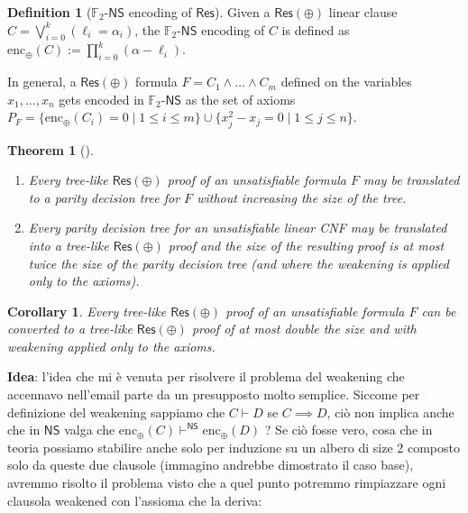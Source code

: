 \documentclass[12pt]{article}
\newtheorem{theorem}{Theorem}
\newtheorem{corollary}{Corollary}
\theoremstyle{definition}
\newtheorem{definition}{Definition}
\newcommand{\F}{\mathbb{F}}
\newcommand{\Res}{\mathsf{Res}}
\newcommand{\ResP}{\mathsf{Res(\oplus)}}
\newcommand{\NS}{\mathsf{NS}}
\newcommand{\FNS}{\F_2\text{-}\mathsf{NS}}
\newcommand{\enc}{\mathrm{enc}}
\begin{document}
    \begin{definition}[$\FNS$ encoding of $\Res$]
        Given a $\ResP$ linear clause $C = \bigvee\limits_{i = 0}^k (\ell_i = \alpha_i)$, the $\FNS$ encoding of $C$ is defined as $\enc_{\oplus}(C) := \prod\limits_{i = 0}^k (\alpha - \ell_i)$.
        
        In general, a $\ResP$ formula $F = C_1 \land \ldots \land C_m$ defined on the variables $x_1, \ldots, x_n$ gets encoded in $\FNS$ as the set of axioms $P_F = \{\enc_{\oplus}(C_i) = 0 \mid 1 \leq i \leq m\} \cup \{x_j^2-x_j = 0 \mid 1 \leq j \leq n\}$.
    \end{definition}

    \begin{theorem}[\cite{res_parity}]
        \;
        \begin{enumerate}
            \item Every tree-like $\ResP$ proof of an unsatisfiable formula $F$ may be translated to a parity decision tree for $F$ without increasing the size of the tree.
            
            \item Every parity decision tree for an unsatisfiable linear CNF may be translated into a tree-like $\ResP$ proof and the size of the resulting proof is at most twice the size of the parity decision tree (and where the weakening is applied only to the axioms).
        \end{enumerate}
    \end{theorem}

    \begin{corollary}
        Every tree-like $\ResP$ proof of an unsatisfiable formula $F$ can be converted to a tree-like $\ResP$ proof of at most double the size and with weakening applied only to the axioms.
    \end{corollary}


    \textbf{Idea}: l'idea che mi è venuta per risolvere il problema del weakening che accennavo nell'email parte da un presupposto molto semplice. Siccome per definizione del weakening sappiamo che $C \vdash D$ se $C \implies D$, ciò non implica anche che in $\NS$ valga che $\enc_{\oplus}(C) \vdash^\NS \enc_{\oplus}(D)$ ? Se ciò fosse vero, cosa che in teoria possiamo stabilire anche solo per induzione su un albero di size 2 composto solo da queste due clausole (immagino andrebbe dimostrato il caso base), avremmo risolto il problema visto che a quel punto potremmo rimpiazzare ogni clausola weakened con l'assioma che la deriva:
\end{document}
